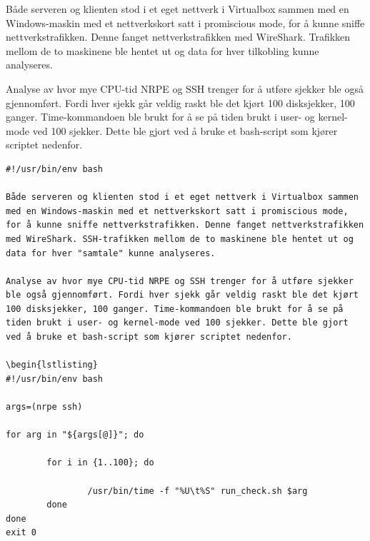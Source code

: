 Både serveren og klienten stod i et eget nettverk i Virtualbox sammen med en Windows-maskin med et nettverkskort satt i promiscious mode, for å kunne sniffe nettverkstrafikken. Denne fanget nettverkstrafikken med WireShark. Trafikken mellom de to maskinene ble hentet ut og data for hver tilkobling kunne analyseres.

Analyse av hvor mye CPU-tid NRPE og SSH trenger for å utføre sjekker ble også gjennomført. Fordi hver sjekk går veldig raskt ble det kjørt 100 disksjekker, 100 ganger. Time-kommandoen ble brukt for å se på tiden brukt i user- og kernel-mode ved 100 sjekker. Dette ble gjort ved å bruke et bash-script som kjører scriptet nedenfor.
\begin{lstlisting}
#!/usr/bin/env bash

Både serveren og klienten stod i et eget nettverk i Virtualbox sammen med en Windows-maskin med et nettverkskort satt i promiscious mode, for å kunne sniffe nettverkstrafikken. Denne fanget nettverkstrafikken med WireShark. SSH-trafikken mellom de to maskinene ble hentet ut og data for hver "samtale" kunne analyseres.  

Analyse av hvor mye CPU-tid NRPE og SSH trenger for å utføre sjekker ble også gjennomført. Fordi hver sjekk går veldig raskt ble det kjørt 100 disksjekker, 100 ganger. Time-kommandoen ble brukt for å se på tiden brukt i user- og kernel-mode ved 100 sjekker. Dette ble gjort ved å bruke et bash-script som kjører scriptet nedenfor.

\begin{lstlisting}
#!/usr/bin/env bash

args=(nrpe ssh)

for arg in "${args[@]}"; do

        for i in {1..100}; do

                /usr/bin/time -f "%U\t%S" run_check.sh $arg
        done
done
exit 0
\end{lstlisting}


